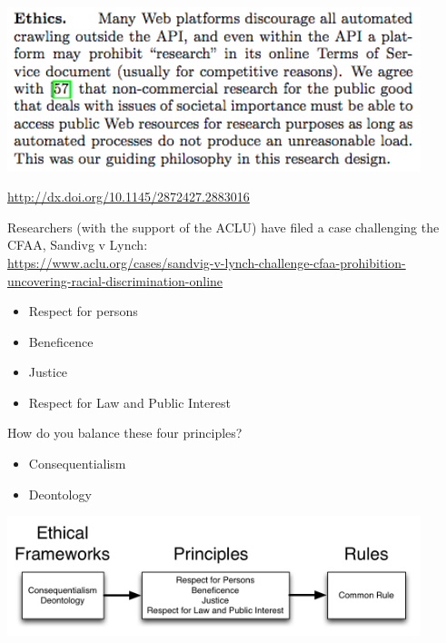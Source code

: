 \documentclass{beamer}
\def\vf{\vfill}
\begin{document}
\begin{frame}

\begin{center}
\includegraphics[width=0.9\textwidth]{figures/soeller_mapwatch_2016_ethics.png}
\end{center}

\vf
\url{http://dx.doi.org/10.1145/2872427.2883016}
\end{frame}
\begin{frame}

Researchers (with the support of the ACLU) have filed a case challenging the CFAA, Sandivg v Lynch:\\
\tiny{\textcolor{blue}{\url{https://www.aclu.org/cases/sandvig-v-lynch-challenge-cfaa-prohibition-uncovering-racial-discrimination-online}}}

\end{frame}
\begin{frame}

\begin{itemize}
\item Respect for persons
\item Beneficence
\item Justice
\item Respect for Law and Public Interest
\end{itemize}

\vf
How do you balance these four principles?

\end{frame}
\begin{frame}

\begin{itemize}
\item Consequentialism
\item Deontology
\end{itemize}

\end{frame}
\begin{frame}

\begin{center}
\includegraphics[width=0.9\textwidth]{figures/ethics_schematic_simple.png}
\end{center}

\end{frame}
\end{document}
